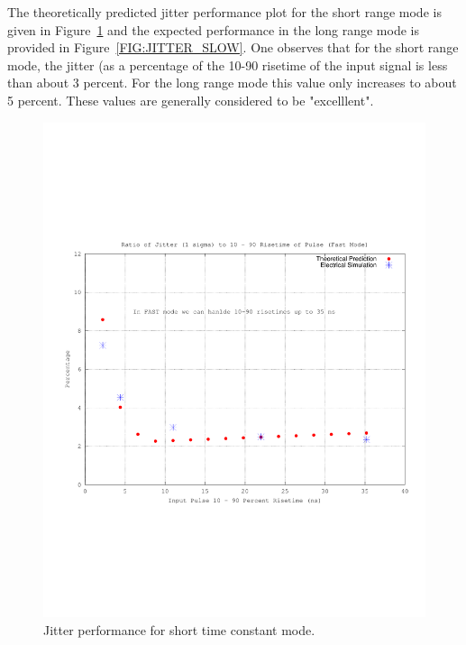 \documentclass[12pt,oneside,final]{siuethesis}
\theoremstyle{definition}
\begin{document}
The theoretically predicted jitter performance plot for the short range mode is given in Figure~\ref{FIG:JITTER_FAST} and the expected performance in the long range mode is provided in Figure~\ref{FIG:JITTER_SLOW}.  One observes that for the short range mode, the jitter (as a percentage of the 10-90 risetime of the input signal is less than about 3 percent.  For the long range mode this value only increases to about 5 percent.  These values are generally considered to be "excelllent".

\begin{figure}[htbp!]
	\centering
 	\includegraphics[scale=0.8,keepaspectratio=true]{../Design_Reports/CFD_circuit_report/images/jitter_fast_mode.pdf} 	
 	\caption{Jitter performance for short time constant mode.}
 	\label{FIG:JITTER_FAST}
 	
\end{figure}
\end{document}
